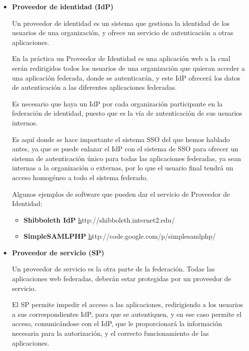 \begin{itemize}
            \item \textbf{Proveedor de identidad (IdP)}

    Un proveedor de identidad es un sistema que gestiona la identidad
    de los usuarios de una organización, y ofrece un servicio de
    autenticación a otras aplicaciones.

    En la práctica un Proveedor de Identidad es una aplicación web a
    la cual serán redirigidos todos los usuarios de una organización
    que quieran acceder a una aplicación federada, donde se
    autenticarán, y este IdP ofrecerá los datos de autenticación a las
    diferentes aplicaciones federadas.

    Es necesario que haya un IdP por cada organización participante en
    la federación de identidad, puesto que es la vía de autenticación
    de sus usuarios internos.

    Es aquí donde se hace importante el sistema SSO del que hemos
    hablado antes, ya que se puede enlazar el IdP con el sistema de
    SSO para ofrecer un sistema de autenticación único para todas las
    aplicaciones federadas, ya sean internas a la organización o
    externas, por lo que el usuario final tendrá un acceso homogéneo a
    todo el sistema federado.

    Algunos ejemplos de software que pueden dar el servicio de Proveedor
    de Identidad:
    \begin{itemize}
        \item \textbf{Shibboleth IdP} \href{http://shibboleth.internet2.edu/}http://shibboleth.internet2.edu/
        \item \textbf{SimpleSAMLPHP} \href{http://code.google.com/p/simplesamlphp/}http://code.google.com/p/simplesamlphp/
    \end{itemize}

            \item \textbf{Proveedor de servicio (SP)}

    Un proveedor de servicio es la otra parte de la federación. Todas
    las aplicaciones web federadas, deberán estar protegidas por un
    proveedor de servicio.

    El SP permite impedir el acceso a las aplicaciones, redirigiendo a
    los usuarios a sus correspondientes IdP, para que se autentiquen,
    y en ese caso permite el acceso, comunicándose con el IdP, que le
    proporcionará la información necesaria para la autorización, y el
    correcto funcionamiento de las aplicaciones.


\end{itemize}
